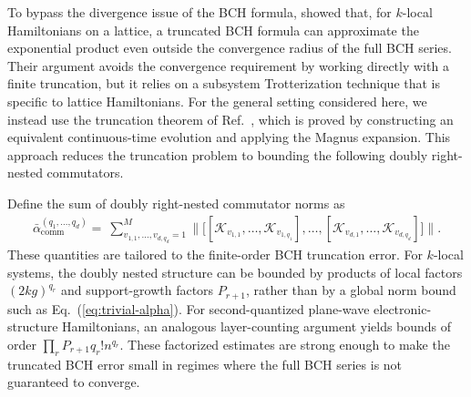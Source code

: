 \documentclass[11pt]{article}
\newcommand{\eq}[1]{(\ref{eq:#1})}
\renewcommand{\comm}{\mathrm{comm}}
\newcommand{\mc}{\mathcal}
\newcommand{\xz}[1]{{\color{cyan} XZ: #1}}
\newcommand{\sz}[1]{{\color{blue} Shuo: #1}}
\begin{document}
To bypass the divergence issue of the BCH formula, \citet{mizuta2025commutator} showed that, for $k$-local Hamiltonians on a lattice, a truncated BCH formula can approximate the exponential product even outside the convergence radius of the full BCH series. Their argument avoids the convergence requirement by working directly with a finite truncation, but it relies on a subsystem Trotterization technique that is specific to lattice Hamiltonians. For the general setting considered here, we instead use the truncation theorem of Ref.~\cite{wang2026lindbladiansimulationcommutatorbounds}, which is proved by constructing an equivalent continuous-time evolution and applying the Magnus expansion. This approach reduces the truncation problem to bounding the following doubly right-nested commutators.

Define the sum of doubly right-nested commutator norms as
\begin{align}
\label{eq:def-beta-bar-general}
    \bar{\alpha}_{\comm}^{(q_1, \ldots, q_{d})}
    =~ 
    \sum_{v_{1,1}, \ldots, v_{d, q_{d}} = 1}^M \bigg\| \Big[ 
         [\mc K_{v_{1,1}}, \ldots, \mc K_{v_{1,q_1}}], \ldots, 
        [\mc K_{v_{d,1}}, \ldots, \mc K_{v_{d,q_{d}}}]
     \Big] \bigg\|.
\end{align}
These quantities are tailored to the finite-order BCH truncation error. For $k$-local systems, the doubly nested structure can be bounded by products of local factors $(2kg)^{q_r}$ and support-growth factors $P_{r+1}$, rather than by a global norm bound such as Eq.~\eq{trivial-alpha}. For second-quantized plane-wave electronic-structure Hamiltonians, an analogous layer-counting argument yields bounds of order $\prod_r P_{r+1}q_r!n^{q_r}$. These factorized estimates are strong enough to make the truncated BCH error small in regimes where the full BCH series is not guaranteed to converge.
\end{document}
